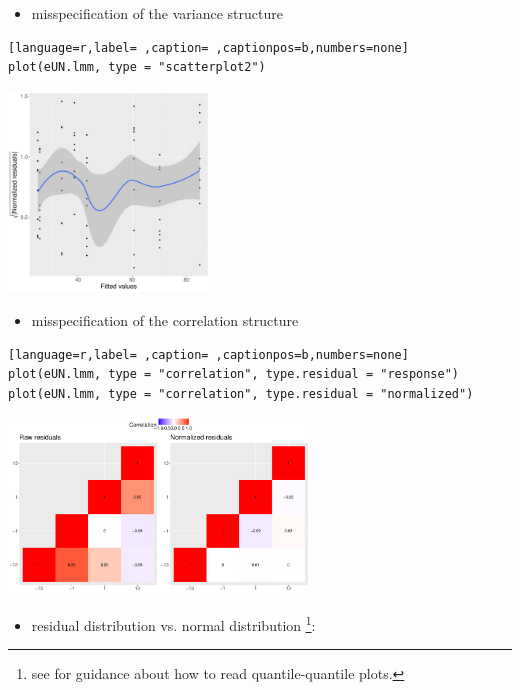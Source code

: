 \documentclass[12pt]{article}
\begin{document}
\clearpage

\begin{itemize}
\item misspecification of the variance structure
\end{itemize}
\begin{lstlisting}[language=r,label= ,caption= ,captionpos=b,numbers=none]
plot(eUN.lmm, type = "scatterplot2")
\end{lstlisting}

\begin{center}
\includegraphics[width=0.4\textwidth]{./figures/diag-scatterplot2.pdf}
\end{center}

\begin{itemize}
\item misspecification of the correlation structure
\end{itemize}
\begin{lstlisting}[language=r,label= ,caption= ,captionpos=b,numbers=none]
plot(eUN.lmm, type = "correlation", type.residual = "response")
plot(eUN.lmm, type = "correlation", type.residual = "normalized")
\end{lstlisting}

\begin{center}
\includegraphics[width=0.6\textwidth]{./figures/diag-correlation.pdf}
\end{center}

\begin{itemize}
\item residual distribution vs. normal distribution \footnote{see \cite{oldford2016self} for guidance
about how to read quantile-quantile plots.}:
\end{itemize}
\end{document}
